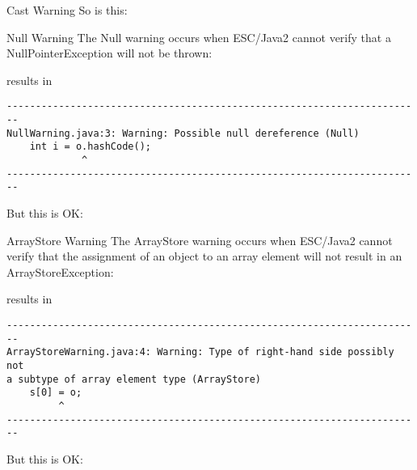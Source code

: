 \documentclass[
pdf,
nocolorBG,
slideColor,
cok,
]{prosper}
\begin{document}
\begin{slide}{Cast Warning}
So is this:
\begin{figure*}
\tiny

\end{figure*}

\end{slide}

\begin{slide}{Null Warning}
\vspace*{-9ex}
The Null warning occurs when ESC/Java2 cannot verify that a NullPointerException will not be thrown:
{\tiny
\begin{figure*}

\end{figure*}
}
results in
{\tiny
\begin{verbatim}
------------------------------------------------------------------------
NullWarning.java:3: Warning: Possible null dereference (Null)
    int i = o.hashCode();
             ^
------------------------------------------------------------------------
\end{verbatim}
}

But this is OK:
{\tiny
\begin{figure*}

\end{figure*}
}


\end{slide}
\begin{slide}{ArrayStore Warning}
\tiny
\vspace*{-12ex}
The ArrayStore warning occurs when ESC/Java2 cannot verify that the assignment of an object 
to an array element will not result in an ArrayStoreException:
\vspace*{-1ex}
{\tiny
\begin{figure*}

\end{figure*}
}
\vspace*{-2ex}
results in
\vspace*{-1ex}
{\tiny
\begin{verbatim}
------------------------------------------------------------------------
ArrayStoreWarning.java:4: Warning: Type of right-hand side possibly not 
a subtype of array element type (ArrayStore)
    s[0] = o;
         ^
------------------------------------------------------------------------
\end{verbatim}
}
\vspace*{-1ex}
But this is OK:
\vspace*{-1ex}
{\tiny
\begin{figure*}

\end{figure*}
}
\end{slide}
\end{document}
